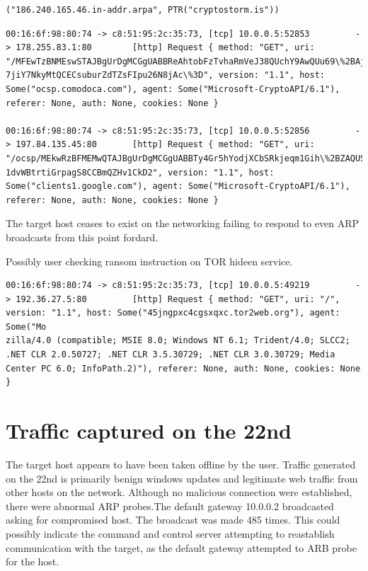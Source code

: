 \documentclass[11pt]{diazessay} %
\begin{document}
\begin{lstlisting}
("186.240.165.46.in-addr.arpa", PTR("cryptostorm.is"))
\end{lstlisting}

\begin{lstlisting}
00:16:6f:98:80:74 -> c8:51:95:2c:35:73, [tcp] 10.0.0.5:52853         -> 178.255.83.1:80        [http] Request { method: "GET", uri: "/MFEwTzBNMEswSTAJBgUrDgMCGgUABBReAhtobFzTvhaRmVeJ38QUchY9AwQUu69\%2BAj36pvE8hI6t
7jiY7NkyMtQCECsuburZdTZsFIpu26N8jAc\%3D", version: "1.1", host: Some("ocsp.comodoca.com"), agent: Some("Microsoft-CryptoAPI/6.1"), referer: None, auth: None, cookies: None }

00:16:6f:98:80:74 -> c8:51:95:2c:35:73, [tcp] 10.0.0.5:52856         -> 197.84.135.45:80       [http] Request { method: "GET", uri: "/ocsp/MEkwRzBFMEMwQTAJBgUrDgMCGgUABBTy4Gr5hYodjXCbSRkjeqm1Gih\%2BZAQUSt0GFhu89mi
1dvWBtrtiGrpagS8CCBmQZHv1CkD2", version: "1.1", host: Some("clients1.google.com"), agent: Some("Microsoft-CryptoAPI/6.1"), referer: None, auth: None, cookies: None }
\end{lstlisting}


The target host ceases to exist on the networking failing to respond to even ARP broadcasts from this point fordard. 


Possibly user checking ransom instruction on TOR hideen service.
\begin{lstlisting}
00:16:6f:98:80:74 -> c8:51:95:2c:35:73, [tcp] 10.0.0.5:49219         -> 192.36.27.5:80         [http] Request { method: "GET", uri: "/", version: "1.1", host: Some("45jngpxc4cgsxqxc.tor2web.org"), agent: Some("Mo
zilla/4.0 (compatible; MSIE 8.0; Windows NT 6.1; Trident/4.0; SLCC2; .NET CLR 2.0.50727; .NET CLR 3.5.30729; .NET CLR 3.0.30729; Media Center PC 6.0; InfoPath.2)"), referer: None, auth: None, cookies: None }
\end{lstlisting}



\section*{Traffic captured on the 22nd}

The target host appears to have been taken offline by the user. Traffic generated on the 22nd is primarily benign windows updates and legitimate web traffic from other hosts on the network. Although no malicious connection were established, there were abnormal ARP probes.The default gateway 10.0.0.2 broadcasted asking for compromised host. The broadcast was made 485 times. This could possibly indicate the command and control server attempting to reastablish communication with the target, as the default gateway attempted to ARB probe for the host.
\end{document}
